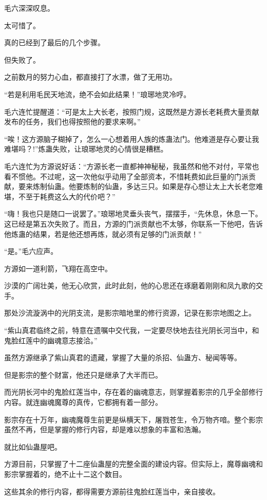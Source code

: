 \begin{this_body}
毛六深深叹息。

太可惜了。

真的已经到了最后的几个步骤。

但失败了。

之前数月的努力心血，都直接打了水漂，做了无用功。

“若是利用毛民天地流，绝不会如此结果！”琅琊地灵冷哼。

毛六连忙提醒道：“可是太上大长老，按照门规，这既然是方源长老耗费大量贡献发布的任务，我们也得按照他的要求来啊。”

“唉！这方源脑子糊掉了，怎么一心想着用人族的炼蛊法门。他难道是存心要让我难堪吗？!”炼蛊失败，让琅琊地灵的心情很是糟糕。

毛六连忙为方源说好话：“方源长老一直都神神秘秘，我虽然和他不对付，平常也看不惯他。不过呢，这一次他似乎动用了全部资本，不惜耗费如此巨量的门派贡献，要来炼制仙蛊。他要炼制的仙蛊，多达三只。如果是存心想让太上大长老您难堪，不至于耗费这么大的代价吧？”

“嗨！我也只是随口一说罢了。”琅琊地灵垂头丧气，摆摆手，“先休息，休息一下。这已经是第五次失败了。而且，方源的门派贡献也不太够，你联系一下他吧，告诉他炼蛊的结果，若是他还想再炼，就必须有足够的门派贡献！”

“是。”毛六应声。

方源如一道利箭，飞翔在高空中。

沙漠的广阔壮美，他无心欣赏，此时此刻，他的心思还在琢磨着刚刚和凤九歌的交手。

那处沙流漩涡中的光阴支流，是影宗暗地里的修行资源，记录在影宗地图之上。

“紫山真君临终之前，特意在遗嘱中交代我，一定要尽快地去往光阴长河当中，和鬼脸红莲中的幽魂意志接洽。”

虽然方源继承了紫山真君的遗藏，掌握了大量的杀招、仙蛊方、秘闻等等。

但是影宗的整个财富，他还只是继承了大半而已。

而光阴长河中的鬼脸红莲当中，存在着的幽魂意志，则掌握着影宗的几乎全部修行内容。就连幽魂魔尊的真传，它都拥有着一部分。

影宗存在十万年，幽魂魔尊生前更是纵横天下，屠戮苍生，令万物齐喑。整个影宗虽然不再，但是掌握的修行内容，却是难以想象的丰富和浩瀚。

就比如仙蛊屋吧。

方源目前，只掌握了十二座仙蛊屋的完整全面的建设内容。但实际上，魔尊幽魂和影宗掌握着的，绝不止十二这个数目。

这些其余的修行内容，都得需要方源前往鬼脸红莲当中，亲自接收。


\end{this_body}
